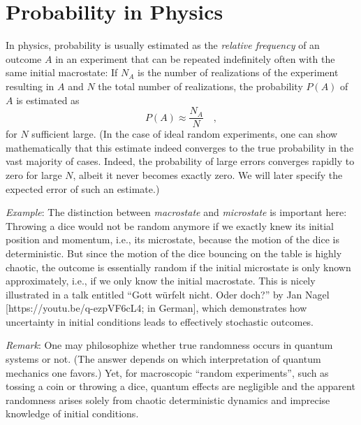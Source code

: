 \documentclass{notebook}
\makeatletter
\newcommand{\Remark}{\textit{Remark}} %
\newcommand{\Example}{\textit{Example}}
\makeatother
\begin{document}
\section{Probability in Physics}

In physics, probability is usually estimated as 
the \textit{relative frequency} of an outcome $A$ in an experiment
that can be repeated indefinitely often with the same initial macrostate:
If $N_A$ is the number of realizations of the experiment resulting in $A$ 
and $N$ the total number of realizations, the probability $P(A)$ of $A$ is estimated as
\begin{equation}
P(A) \approx \frac{N_A}{N} \quad,
\end{equation}
for $N$ sufficient large.
(In the case of ideal random experiments, 
one can show mathematically that
this estimate indeed converges to the true probability 
in the vast majority of cases. 
Indeed, the probability of large errors converges rapidly to zero for large $N$, 
albeit it never becomes exactly zero.
We will later specify the expected error of such an estimate.) %

\Example: 
The distinction between \textit{macrostate} and \textit{microstate} is important here: 
Throwing a dice would not be random anymore if we exactly knew its initial position and momentum, 
i.e., its microstate, because the motion of the dice is deterministic. 
But since the motion of the dice bouncing on the table is highly chaotic, 
the outcome is essentially random if the initial microstate is only known approximately, 
i.e., if we only know the initial macrostate.
This is nicely illustrated in a talk entitled 
``Gott w\"urfelt nicht. Oder doch?'' by Jan Nagel [https://youtu.be/q-ezpVF6cL4; in German], 
which demonstrates how uncertainty in initial conditions leads to effectively stochastic outcomes.

\Remark: 
One may philosophize whether true randomness occurs in quantum systems or not.
(The answer depends on which interpretation of quantum mechanics one favors.)
Yet, for macroscopic ``random experiments'', such as tossing a coin or throwing a dice, 
quantum effects are negligible and the apparent randomness arises solely from chaotic deterministic dynamics
and imprecise knowledge of initial conditions.
\end{document}
